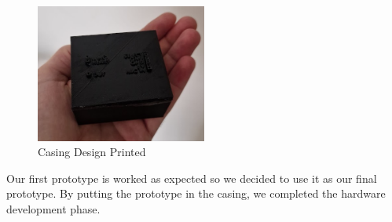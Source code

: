\begin{figure}[h]
	\centering
	\includegraphics[width=0.5\textwidth]{assets/3d-design-printed.png}
	\caption{Casing Design Printed}
	\label{fig:casing_design_printed}
\end{figure}

Our first prototype is worked as expected so we decided to use it as our final prototype. By putting the prototype in the casing, we completed the hardware development phase.
